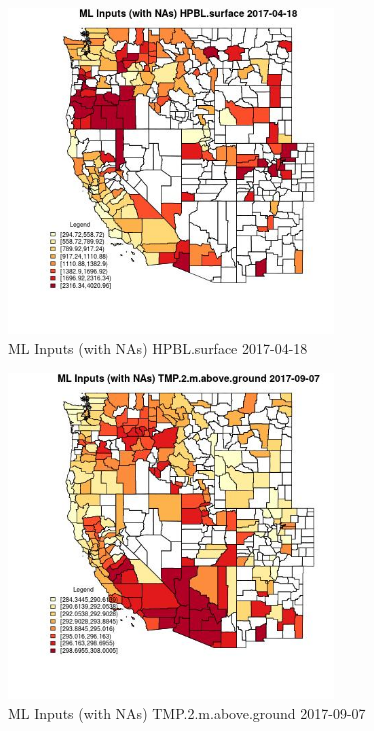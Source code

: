 \begin{figure} 
\centering  
\includegraphics[width=0.77\textwidth]{Code_Outputs/Report_ML_input_PM25_Step4_part_e_de_duplicated_aves_compiled_2019-05-21wNAs_CountyHPBLsurfaceMean2017-04-18.jpg} 
\caption{\label{fig:Report_ML_input_PM25_Step4_part_e_de_duplicated_aves_compiled_2019-05-21wNAsCountyHPBLsurfaceMean2017-04-18}ML Inputs (with NAs) HPBL.surface 2017-04-18} 
\end{figure} 
 

\begin{figure} 
\centering  
\includegraphics[width=0.77\textwidth]{Code_Outputs/Report_ML_input_PM25_Step4_part_e_de_duplicated_aves_compiled_2019-05-21wNAs_CountyTMP2mabovegroundMean2017-09-07.jpg} 
\caption{\label{fig:Report_ML_input_PM25_Step4_part_e_de_duplicated_aves_compiled_2019-05-21wNAsCountyTMP2mabovegroundMean2017-09-07}ML Inputs (with NAs) TMP.2.m.above.ground 2017-09-07} 
\end{figure} 
 

